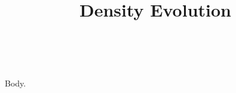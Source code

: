 \documentclass{article}
\title{Density Evolution}
\author{\fnms{Kisung}~\snm{You}}
\begin{document}
\maketitle
Body.
\end{document}
